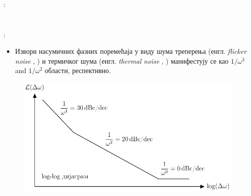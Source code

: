 \documentclass[aspectratio=169]{beamer}
\makeatletter
\newcommand*{\engl}[2][\@empty]{%
    \edef\theacronym{#1}%
    (енгл. \foreignlanguage{english}{\emph{#2}%
    \ifx\theacronym\@empty \else , #1\fi})%
}
\makeatother
\begin{document}
\begin{frame}{\secname: \subsecname}
\begin{columns}[t]
\begin{column}{0.5\textwidth}
\begin{figure}[!t]
            \end{figure}
	\end{column}
    \end{columns}
\end{frame}

\begin{frame}{\secname: \subsecname}
    \begin{itemize}
        \item Извори насумичних фазних поремећаја у виду шума треперења \engl{flicker noise} и термичког шума \engl{thermal noise} манифестују се као $1/\omega^3$ and $1/\omega^2$ области, респективно.
    \end{itemize}
    \begin{figure}[!t]
	    \centering
	    \includegraphics[scale=0.7]{slike/prezentacija/osc_noise_2.pdf}
    \end{figure}
\end{frame}
\end{document}
